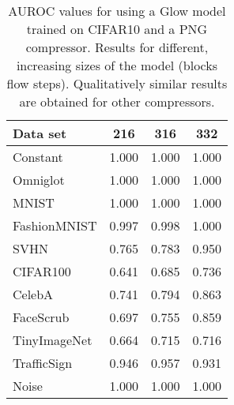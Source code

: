 \documentclass[letterpaper]{article} \usepackage{iclr2020_conference,times}
\begin{document}
\begin{table}[t]
\caption{AUROC values for  using a Glow model trained on CIFAR10 and a PNG compressor. Results for different, increasing sizes of the model (blocks  flow steps). Qualitatively similar results are obtained for other compressors.}
\label{tab:modelsize}
\begin{center}
\begin{tabular}{lccc}
\hline
Data set        & 216 & 316 & 332\\
\hline
Constant        & 1.000   & 1.000 & 1.000 \\
Omniglot        & 1.000   & 1.000 & 1.000 \\
MNIST           & 1.000   & 1.000 & 1.000 \\
FashionMNIST    & 0.997   & 0.998 & 1.000 \\
SVHN            & 0.765   & 0.783 & 0.950 \\
CIFAR100        & 0.641   & 0.685 & 0.736 \\
CelebA          & 0.741   & 0.794 & 0.863 \\
FaceScrub       & 0.697   & 0.755 & 0.859 \\
TinyImageNet    & 0.664   & 0.715 & 0.716 \\
TrafficSign     & 0.946   & 0.957 & 0.931 \\
Noise           & 1.000   & 1.000 & 1.000 \\
\hline
\end{tabular}
\end{center}
\end{table}
\end{document}
